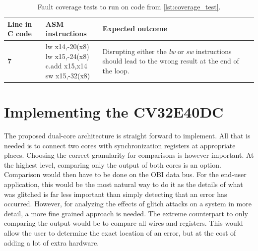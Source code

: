 \begin{table}[h]
\centering
\caption{Fault coverage tests to run on code from \autoref{lst:coverage_test}.}
\label{tab:coverage_test}
\begin{tabular}{m{2.5cm}m{3.5cm}m{7.5cm}}
\toprule 
Line in C code & ASM instructions & Expected outcome \\
\midrule
\rowcolor{black!20} \textbf{7} & \makecell{lw	x14,-20(x8) \\ lw x15,-24(x8) \\ c.add x15,x14 \\ sw x15,-32(x8)} & Disrupting either the \textit{lw} or \textit{sw} instructions should lead to the wrong result at the end of the loop.\\
\bottomrule
\end{tabular}
\end{table}

\section{Implementing the CV32E40DC}
\label{sec:dualcore}

The proposed dual-core architecture is straight forward to implement. All that is needed is to connect two cores with synchronization registers at appropriate places. Choosing the correct granularity for comparisons is however important. At the highest level, comparing only the output of both cores is an option. Comparison would then have to be done on the OBI data bus. For the end-user application, this would be the most natural way to do it as the details of what was glitched is far less important than simply detecting that an error has occurred. However, for analyzing the effects of glitch attacks on a system in more detail, a more fine grained approach is needed. The extreme counterpart to only comparing the output would be to compare all wires and registers. This would allow the user to determine the exact location of an error, but at the cost of adding a lot of extra hardware. 

